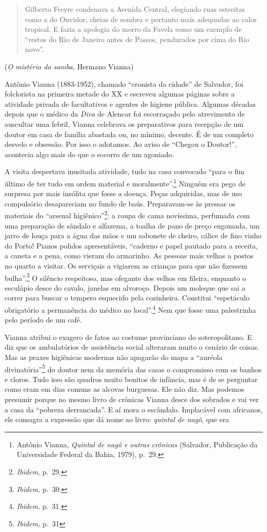 \begin{quote}
Gilberto Freyre condenava a Avenida Central, elogiando ruas estreitas
como a do Ouvidor, cheias de sombra e portanto mais adequadas ao calor
tropical. E fazia a apologia do morro da Favela como um exemplo de
``restos do Rio de Janeiro antes de Passos, pendurados por cima do Rio
novo''.
\end{quote}

(\textit{O mistério do samba,} Hermano Vianna)

Antônio Vianna (1883-1952), chamado ``cronista da cidade'' de Salvador,
foi folclorista na primeira metade do XX e escreveu algumas páginas
sobre a atividade privada de facultativos e agentes de higiene pública.
Algumas décadas depois que o médico da \textit{Diva} de Alencar foi
escorraçado pelo atrevimento de auscultar uma febril, Vianna celebrava
os preparativos para recepção de um doutor em casa de família abastada
ou, no mínimo, decente. É de um completo desvelo e obsessão. Por isso o
adotamos. Ao aviso de ``Chegou o Doutor!'', acontecia algo mais do que o
socorro de um agoniado.

A visita despertava inusitada atividade, tudo na casa convocado ``para o
fim último de ter tudo em ordem material e moralmente''.\footnote{Antônio
  Vianna, \textit{Quintal de nagô e outras crônicas} (Salvador, Publicação
  da Universidade Federal da Bahia, 1979), p.~29.} Ninguém era pego de
surpresa por mais insólita que fosse a doença. Peças adquiridas, mas de
uso compulsório desapareciam no fundo de baús. Preparavam-se às pressas
os materiais do ``arsenal higiênico''\footnote{\textit{Ibidem}, p.~29.}: a
roupa de cama novíssima, perfumada com uma preparação de sândalo e
alfazema, a toalha de pano de preço engomada, um jarro de louça para a
água das mãos e um sabonete de cheiro, cálice de fino vinho do Porto!
Pianos polidos apresentáveis, ``caderno e papel pautado para a receita,
a caneta e a pena, como vieram do armarinho. As pessoas mais velhas a
postos no quarto a visitar. Os serviçais a vigiarem as crianças para que
não fizessem bulha''.\footnote{\textit{Ibidem,} p.~30.} O silêncio
respeitoso, mas ofegante dos velhos em fileira, enquanto o esculápio
desce do cavalo, janelas em alvoroço. Depois um moleque que sai a correr
para buscar o tempero esquecido pela cozinheira. Constitui ``espetáculo
obrigatório a permanência do médico no local''.\footnote{\textit{Ibidem},
  p.~31.} Nem que fosse uma palestrinha pelo período de um café.

Vianna atribui o exagero de fatos ao costume provinciano do
soteropolitano. E diz que os ambulatórios de assistência social
alteraram muito o cenário de coisas. Mas as praxes higiênicas modernas
não apagarão do mapa a ``auréola divinatória''\footnote{\textit{Ibidem,}
  p.~31} do doutor nem da memória das casas o compromisso com os banhos
e cloros. Tudo isso são quadros muito bonitos de infância, mas é de se
perguntar como eram em dias comuns as alcovas burguesas. Ele não diz.
Mas podemos presumir porque no mesmo livro de crônicas Vianna desce dos
sobrados e vai ver a casa da ``pobreza derrancada''. E aí mora o
escândalo. Implacável com africanos, ele consagra a expressão que dá
nome ao livro: \textit{quintal de nagô}, que era

